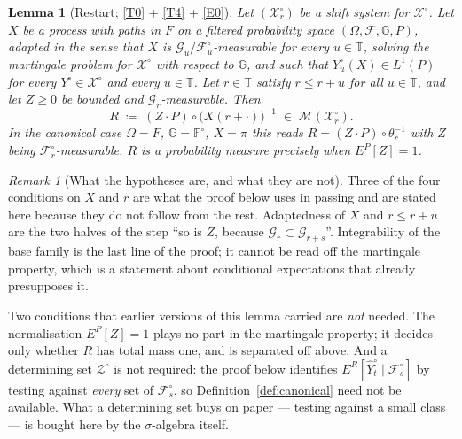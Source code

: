 \documentclass[11pt,a4paper]{article}
\theoremstyle{plain}
\newtheorem{lemma}[theorem]{Lemma}
\theoremstyle{definition}
\theoremstyle{remark}
\newtheorem{remark}[theorem]{Remark}
\newcommand{\T}{\mathbb{T}}                     %
\newcommand{\Filt}{\mathcal{F}}
\newcommand{\Gilt}{\mathcal{G}}
\newcommand{\XX}{\mathcal{X}}                  %
\newcommand{\ZZ}{\mathcal{Z}}                  %
\newcommand{\Msol}{\mathcal{M}}
\begin{document}
\begin{lemma}[Restart; \eqref{T0} + \eqref{T4} + \eqref{E0}]
  \label{lem:restart}
  Let $(\XX^\circ_r)$ be a shift system for $\XX^\circ$.  Let $X$ be a process
  with paths in $F$ on a filtered probability space
  $(\Omega,\Filt,\mathbb{G},P)$, \emph{adapted} in the sense that $X$ is
  $\Gilt_u/\Filt^\circ_u$-measurable for every $u \in \T$, solving the martingale
  problem for $\XX^\circ$ with respect to $\mathbb{G}$, and such that
  $Y^\circ_u(X) \in L^1(P)$ for every $Y^\circ \in \XX^\circ$ and every
  $u \in \T$.  Let $r \in \T$ satisfy $r \leq r+u$ for all $u \in \T$, and let
  $Z \geq 0$ be bounded and $\Gilt_r$-measurable.  Then
  \begin{equation}
    \label{eq:restart}
    R \;\coloneqq\; (Z \cdot P) \circ \bigl( X(r+\cdot) \bigr)^{-1}
      \;\in\; \Msol(\XX^\circ_r) .
  \end{equation}
  In the canonical case $\Omega = F$, $\mathbb{G} = \mathbb{F}^\circ$, $X = \pi$
  this reads $R = (Z \cdot P) \circ \theta_r^{-1}$ with $Z$ being
  $\Filt^\circ_r$-measurable.  $R$ is a probability measure precisely when
  $E^P[Z] = 1$.
\end{lemma}

\begin{remark}[What the hypotheses are, and what they are not]
  \label{rem:restarthyp}
  Three of the four conditions on $X$ and $r$ are what the proof below uses in
  passing and are stated here because they do not follow from the rest.
  Adaptedness of $X$ and $r \leq r+u$ are the two halves of the step ``so is
  $Z$, because $\Gilt_r \subset \Gilt_{r+s}$''.  Integrability of the base family
  is the last line of the proof; it cannot be read off the martingale property,
  which is a statement about conditional expectations that already presupposes
  it.

  Two conditions that earlier versions of this lemma carried are \emph{not}
  needed.  The normalisation $E^P[Z] = 1$ plays no part in the martingale
  property; it decides only whether $R$ has total mass one, and is separated off
  above.  And a determining set $\ZZ^\circ$ is not required: the proof below
  identifies $E^R[\hat Y^\circ_t \mid \Filt^\circ_s]$ by testing against
  \emph{every} set of $\Filt^\circ_s$, so Definition~\ref{def:canonical} need not
  be available.  What a determining set buys on paper --- testing against a small
  class --- is bought here by the $\sigma$-algebra itself.
\end{remark}
\end{document}
